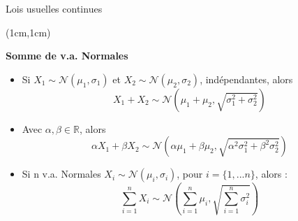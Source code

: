 \documentclass{beamer}
\newcommand{\R}{\mathbb{R}}
\begin{document}
\begin{frame}{Lois usuelles continues}
\begin{textblock*}{\textwidth}(1cm,1cm)

\begin{center}{\bf \Large Somme de v.a. Normales} \end{center}

\begin{itemize}
\item Si $X_1\sim \mathcal{N}(\mu_1,\sigma_1)$ et $X_2\sim\mathcal{N}(\mu_2,\sigma_2)$, indépendantes, alors
 $$X_1 + X_2\sim \mathcal{N}\left(\mu_1+\mu_2,\sqrt{\sigma_1^2+\sigma_2^2}\right)$$

\item Avec $\alpha, \beta \in \R$, alors
 $$\alpha X_1 + \beta X_2\sim \mathcal{N}\left(\alpha\mu_1+\beta\mu_2,\sqrt{\alpha^2\sigma_1^2+\beta^2\sigma_2^2}\right)$$

\item Si n v.a. Normales $X_i\sim \mathcal{N}(\mu_i,\sigma_i)$, pour $i=\{1, ...n\}$, alors :
 $$\sum_{i=1}^n X_i \sim \mathcal{N}\left(\sum_{i=1}^n \mu_i,\sqrt{\sum_{i=1}^n \sigma_i^2}\right)$$
\end{itemize}


\end{textblock*}

\end{frame}
\end{document}
